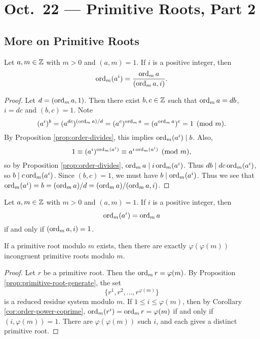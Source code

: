 \chapter{Oct.~22 --- Primitive Roots, Part 2}

\section{More on Primitive Roots}

\begin{prop}
  Let $a, m \in \mathbb{Z}$ with $m > 0$ and
  $(a, m) = 1$. If $i$ is a positive
  integer, then
  \[
    \operatorname{ord}_m(a^i)
    = \frac{\operatorname{ord}_m a}{(\operatorname{ord}_m a, i)}.
  \]
\end{prop}

\begin{proof}
  Let $d = (\operatorname{ord}_m a, 1)$. Then there exist
  $b, c \in \mathbb{Z}$ such that
  $\operatorname{ord}_m a = db$, $i = dc$ and
  $(b, c) = 1$. Note
  \[
    (a^i)^b
    = (a^{dc})^{(\operatorname{ord}_m a)/d}
    = (a^c)^{\operatorname{ord}_m a}
    = (a^{\operatorname{ord}_m a})^c
    = 1 \pmod{m}.
  \]
  By Proposition \ref{prop:order-divides},
  this implies $\operatorname{ord}_m(a^i) \mid b$. Also,
  \[
    1 \equiv (a^i)^{\operatorname{ord}_m(a^i)}
    \equiv a^{i \operatorname{ord}_m (a^i)} \pmod{m},
  \]
  so by Proposition \ref{prop:order-divides},
  $\operatorname{ord}_m a \mid i \operatorname{ord}_m(a^i)$. Thus
  $db \mid dc \operatorname{ord}_m(a^i)$, so
  $b \mid c \operatorname{ord}_m(a^i)$. Since
  $(b, c) = 1$, we must have
  $b \mid \operatorname{ord}_m(a^i)$. Thus we see that
  $\operatorname{ord}_m(a^i) = b = (\operatorname{ord}_m a) / d = (\operatorname{ord}_m a) / (\operatorname{ord}_m a, i)$.
\end{proof}

\begin{corollary}\label{cor:order-power-coprime}
  Let $a, m \in \mathbb{Z}$ with $m > 0$ and
  $(a, m) = 1$. If $i$ is a positive
  integer, then
  \[
    \operatorname{ord}_m(a^i) = \operatorname{ord}_m a
  \]
  if and only if $(\operatorname{ord}_m a, i) = 1$.
\end{corollary}

\begin{corollary}\label{cor:primitive-root-count}
  If a primitive root modulo $m$ exists,
  then there are exactly $\varphi(\varphi(m))$
  incongruent primitive roots modulo $m$.
\end{corollary}

\begin{proof}
  Let $r$ be a primitive root. Then
  the $\operatorname{ord}_m r = \varphi(m)$. By
  Proposition \ref{prop:primitive-root-generate},
  the set
  \[
    \{r^1, r^2, \dots, r^{\varphi(m)}\}
  \]
  is a reduced residue system modulo $m$.
  If $1 \le i \le \varphi(m)$, then by
  Corollary \ref{cor:order-power-coprime},
  $\operatorname{ord}_m(r^i) = \operatorname{ord}_m r = \varphi(m)$
  if and only if $(i, \varphi(m)) = 1$.
  There are $\varphi(\varphi(m))$
  such $i$, and each gives a distinct primitive root.
\end{proof}

